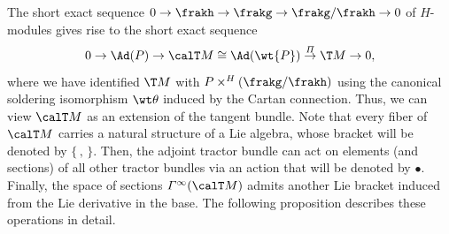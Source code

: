 The short exact sequence $0\to\frakh\to\frakg\to\frakg\slash\frakh\to 0$ of $H$-modules gives rise to the short exact sequence 
\[0\to\Ad(P)\to \calT M\cong \Ad(\wt{P})\overset{\varPi}{\to} \T M\to 0,\]
where we have identified $\T M$ with $P\times^H (\frakg\slash\frakh)$ using the canonical soldering isomorphism $\wt\theta$ induced by the Cartan connection. Thus, we can view $\calT M$ as an extension of the tangent bundle. Note that every fiber of $\calT M$ carries a natural structure of a Lie algebra, whose bracket will be denoted by $\{\,,\,\}$. Then, the adjoint tractor bundle can act on elements (and sections) of all other tractor bundles via an action that will be denoted by $\bullet$. Finally, the space of sections $\varGamma^\infty(\calT M)$ admits another Lie bracket induced from the Lie derivative in the base. The following proposition describes these operations in detail.

